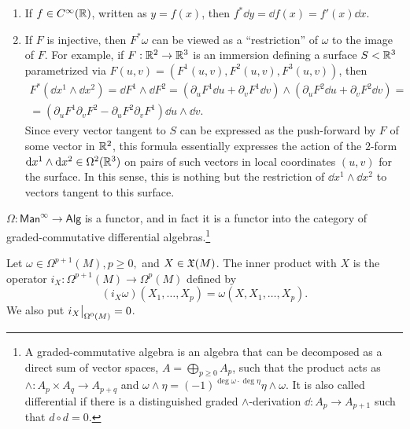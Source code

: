 \begin{example}
    \begin{enumerate}
        \item If $f\in C^\infty(\mathbb{R})$, written as $y=f(x)$, then $f^\ast \dd y=\dd f(x)=f'(x)\dd x$.
        \item If $F$ is injective, then $F^\ast\omega$ can be viewed as a ``restriction'' of $\omega$ to the image of $F$. For example, if $F:\mathbb{R}^2\to \mathbb{R}^3$ is an immersion defining a surface $S<\mathbb{R}^3$ parametrized via $F(u,v)=(F^1(u,v),F^2(u,v),F^3(u,v))$, then 
        \begin{multline}
            F^\ast(\dd x^1\wedge\dd x^2)=\dd F^1\wedge\dd F^2=(\partial_u F^1\dd u+\partial_v F^1\dd v)\wedge(\partial_u F^2\dd u+\partial_v F^2\dd v)=\\=(\partial_u F^1\partial_vF^2-\partial_uF^2\partial_vF^1)\dd u\wedge\dd v.
        \end{multline}
        Since every vector tangent to $S$ can be expressed as the push-forward by $F$ of some vector in $\mathbb{R}^2$, this formula essentially expresses the action of the $2$-form ${\mathrm{d}} x^1\wedge{\mathrm{d}} x^2\in\Omega^2(\mathbb{R}^3)$ on pairs of such vectors in local coordinates $(u,v)$ for the surface. In this sense, this is nothing but the restriction of  $\dd x^1\wedge\dd x^2$ to vectors tangent to this surface.
    \end{enumerate}
\end{example}


\begin{cor}
    $\Omega:\mathsf{Man}^\infty \to\mathsf{Alg}$ is a functor, and in fact it is a functor into the category of graded-commutative differential algebras.\footnote{A graded-commutative algebra is an algebra that can be decomposed as a direct sum of vector spaces, $A=\bigoplus_{p\geq 0}A_p $, such that the product acts as $\wedge:A_p\times A_q\to A_{p+q}$ and $\omega\wedge\eta=(-1)^{\deg\omega\cdot\deg\eta}\eta\wedge\omega$. It is also called differential if there is a distinguished graded $\wedge$-derivation $\dd:A_p\to A_{p+1}$ such that $d\circ d=0$.}
\end{cor}

\begin{defn}
Let $\omega\in\Omega^{p+1}(M), p\geq 0,$ and $X\in\mathfrak{X}(M)$. The inner product with $X$ is the operator $i_X:\Omega^{p+1}(M)\to \Omega^p(M)$ defined by 
\[(i_X \omega)(X_1,\ldots,X_p)=\omega(X,X_1,\ldots,X_p).\]
We also put $\restr{i_X}{\Omega^0(M)}=0$.
\end{defn}


